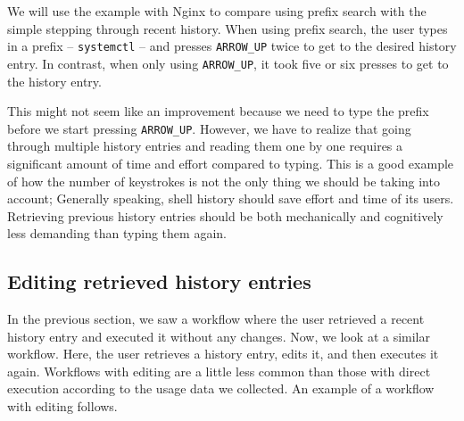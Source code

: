 We will use the example with Nginx to compare using prefix search with the simple stepping through recent history. When using prefix search, the user types in a prefix -- \verb|systemctl| -- and presses \verb|ARROW_UP| twice to get to the desired history entry. In contrast, when only using \verb|ARROW_UP|, it took five or six presses to get to the history entry.

This might not seem like an improvement because we need to type the prefix before we start pressing \verb|ARROW_UP|. However, we have to realize that going through multiple history entries and reading them one by one requires a significant amount of time and effort compared to typing. 
This is a good example of how the number of keystrokes is not the only thing we should be taking into account; Generally speaking, shell history should save effort and time of its users. Retrieving previous history entries should be both mechanically and cognitively less demanding than typing them again.\cite{greenberg1993computer}






\subsection{Editing retrieved history entries}

In the previous section, we saw a workflow where the user retrieved a recent history entry and executed it without any changes. Now, we look at a similar workflow. Here, the user retrieves a history entry, edits it, and then executes it again. Workflows with editing are a little less common than those with direct execution according to the usage data we collected. An example of a workflow with editing follows.

